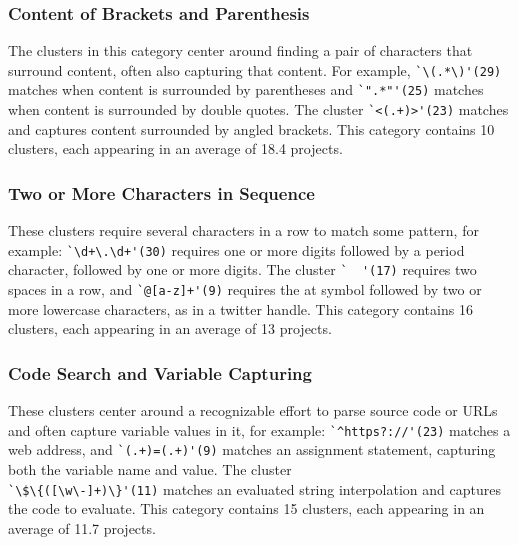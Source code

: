\subsubsection{Content of Brackets and Parenthesis}
\label{cluster:contentparens}
The clusters in this category center around finding a pair of characters that surround content, often also capturing that content. For example,
\verb!`\(.*\)'(29)! matches when content is surrounded by parentheses and \verb!`".*"'(25)! matches  when content is surrounded by double quotes.  The cluster \verb!`<(.+)>'(23)! matches and captures content surrounded by angled brackets.
This category contains 10 clusters, each appearing in an average of 18.4 projects.
\subsubsection{Two or More Characters in Sequence}
\label{cluster:multiple}
These clusters require several characters in a row to match some pattern, for example:
\verb!`\d+\.\d+'(30)! requires one or more digits followed by a period character, followed by one or more digits.  The cluster \verb!`  '(17)! requires two spaces in a row,
and \verb!`@[a-z]+'(9)! requires the at symbol followed by two or more lowercase characters, as in a twitter handle.
This category contains 16 clusters, each appearing in an average of 13 projects.


\subsubsection{Code Search and Variable Capturing}
\label{cluster:search}
These clusters center around a recognizable effort to parse source code or URLs and often capture variable values in it, for example:
\verb!`^https?://'(23)! matches a web address, and \verb!`(.+)=(.+)'(9)! matches an assignment statement, capturing both the variable name and value.
The cluster \\ \verb!`\$\{([\w\-]+)\}'(11)! matches an evaluated string interpolation and captures the code to evaluate.
This category contains 15 clusters, each appearing in an average of 11.7 projects.


